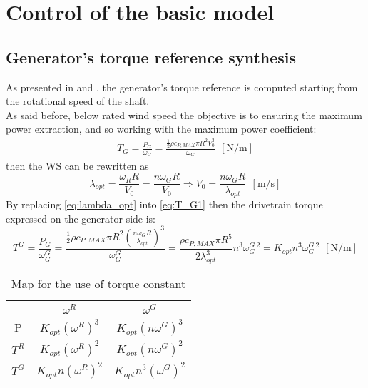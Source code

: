 \newpage
\section{Control of the basic model}\label{sec:c_basic_model_control}

\subsection{Generator's torque reference synthesis}\label{subsec:torque_reference}
As presented in \cite{Aerodynamics_of_wind_turbines} and \cite{SMILDEN2016386}, the generator's torque reference is computed starting from the rotational speed of the shaft. \\
As said before, below rated wind speed the objective is to ensuring the maximum power extraction, and so working with the maximum power coefficient:
\begin{gather}
    T_G=\frac{P_G}{\omega_G}=\frac{\frac{1}{2}\rho c_{P,MAX} \pi R^2 V_0^3}{\omega_G} \ \ \left[\si{\newton\per\meter}\right]
    \label{eq:T_G1}
\end{gather}
then the \acrshort{WS} can be rewritten as
\begin{equation}
    \lambda_{opt} = \frac{\omega_R R}{V_0} = \frac{n \omega_G R}{V_0} \Rightarrow V_0=\frac{n\omega_G R}{\lambda_{opt}}  \ \ \left[\si{\meter\per\second}\right]
    \label{eq:lambda_opt}
\end{equation}
By replacing \autoref{eq:lambda_opt} into \autoref{eq:T_G1} then the drivetrain torque expressed on the generator side is:
\begin{equation}
    T^G=\frac{P_G}{\omega_G^G}=\frac{\frac{1}{2}\rho c_{P,MAX} \pi R^2 \left(\frac{n\omega_G R}{\lambda_{opt}}\right)^3}{\omega_G^G} = \frac{\rho c_{P, MAX} \pi R^5 }{2 \lambda_{opt}^3}n^3\omega_G^{G \ 2} = K_{opt}n^3\omega_G^{G \ 2}  \ \ \left[\si{\newton\per\meter}\right]
    \label{eq:T_G2}
\end{equation}

\begin{table}[htb]
    \centering
    \caption{Map for the use of torque constant}
    \begin{tabular}{ccc}
    \toprule
         & $\omega^R$ & $\omega^G$  \\ \midrule
         P & $K_{opt} \left(\omega^{R}\right)^3$ & $K_{opt}\left(n \omega^{G}\right)^3$\\
         $T^R$ & $K_{opt} \left( \omega^{R}\right)^2$ & $K_{opt}\left(n \omega^{G}\right)^2$\\
         $T^G$ & $K_{opt} n \left(\omega^{R}\right)^2$ &  $K_{opt} n^3\left(\omega^{G}\right)^2$\\ \bottomrule
    \end{tabular}
    \label{tab:gain_map}
\end{table}


